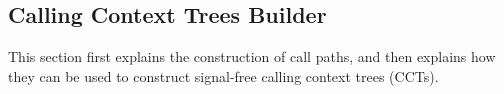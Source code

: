     
    








\subsection{Calling Context Trees Builder}
This section first explains the construction of call paths, and then explains how they can be used to construct signal-free calling context trees (CCTs). 

